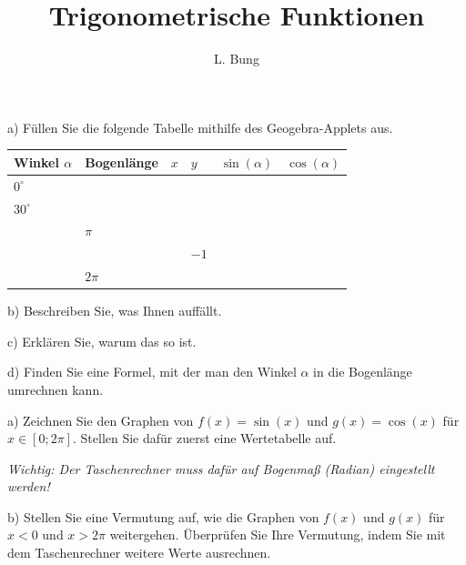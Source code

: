 \documentclass[11pt, a4paper, oneside]{article}
\begin{document}
	\author{L. Bung}
	\title{Trigonometrische Funktionen}
	\subject{Mathematik}
	\maketitle
	
	\begin{minipage}{.75\textwidth}
			
		a) Füllen Sie die folgende Tabelle mithilfe des Geogebra-Applets aus.\\
		
		\begin{tabular}{|p{1.5cm}|p{2cm}|p{1.5cm}|p{1.5cm}|p{1cm}|p{1cm}|}
			\hline
			Winkel $\alpha$ & Bogenlänge & $x$ & $y$ & $\sin(\alpha)$ & $\cos(\alpha)$\\
			\hline
			\hline
			$0^\circ$ &&&&&\\
			\hline
			$30^\circ$ &&&&&\\
			\hline
			& $\pi$ &&&&\\
			\hline
			&&& $-1$&&\\
			\hline
			& $2\pi$ &&&&\\
			\hline
		\end{tabular}
	\end{minipage}
	\begin{minipage}{.25\textwidth}
		\centering
	\end{minipage}
	
	b) Beschreiben Sie, was Ihnen auffällt.
	
	\lines[2cm]
	
	c) Erklären Sie, warum das so ist.
	
	\lines[3cm]
	
	d) Finden Sie eine Formel, mit der man den Winkel $\alpha$ in die Bogenlänge umrechnen kann.
	
	\checkered[3cm]
	
	
	
	a) Zeichnen Sie den Graphen von $f(x) = \sin(x)$ und $g(x) = \cos(x)$ für $x \in \left[0; 2\pi\right]$.
	Stellen Sie dafür zuerst eine Wertetabelle auf.
	
	\emph{Wichtig: Der Taschenrechner muss dafür auf Bogenmaß (Radian) eingestellt werden!}
	
	\checkered[8cm]
	
	b) Stellen Sie eine Vermutung auf, wie die Graphen von $f(x)$ und $g(x)$ für $x < 0$ und $x > 2\pi$ weitergehen.
	Überprüfen Sie Ihre Vermutung, indem Sie mit dem Taschenrechner weitere Werte ausrechnen.
	
\end{document}
